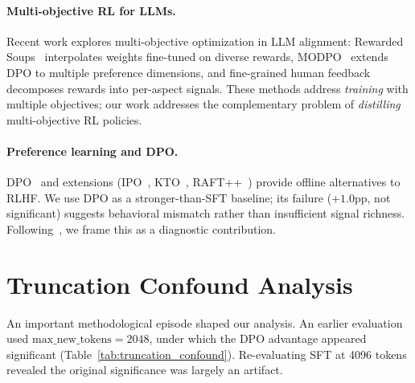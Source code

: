 \paragraph{Multi-objective RL for LLMs.}
Recent work explores multi-objective optimization in LLM alignment: Rewarded Soups~\cite{rame2024rewarded} interpolates weights fine-tuned on diverse rewards, MODPO~\cite{zhou2024modpo} extends DPO to multiple preference dimensions, and fine-grained human feedback~\cite{wu2024finegrained} decomposes rewards into per-aspect signals. These methods address \emph{training} with multiple objectives; our work addresses the complementary problem of \emph{distilling} multi-objective RL policies.

\paragraph{Preference learning and DPO.}
DPO~\cite{rafailov2023dpo} and extensions (IPO~\cite{gheshlaghi2024ipo}, KTO~\cite{ethayarajh2024kto}, RAFT++~\cite{dong2023raft}) provide offline alternatives to RLHF. We use DPO as a stronger-than-SFT baseline; its failure ($+1.0$pp, not significant) suggests behavioral mismatch rather than insufficient signal richness. Following~\citet{karl2024negative}, we frame this as a diagnostic contribution.

\section{Truncation Confound Analysis}
\label{app:trunc_confound}

An important methodological episode shaped our analysis. An earlier evaluation used $\text{max\_new\_tokens}=2048$, under which the DPO advantage appeared significant (Table~\ref{tab:truncation_confound}). Re-evaluating SFT at 4096 tokens revealed the original significance was largely an artifact.

\begin{table}[h]
\centering
\small
{}
\caption{Truncation confound at $N\!=\!8$. Extending SFT's budget to 4096 tokens lifted em\_partial from $0.011$ to $0.025$ and revealed the DPO advantage is not significant. $^{\dagger}$DPO was always evaluated at 4096.}
\label{tab:truncation_confound}
\end{table}

